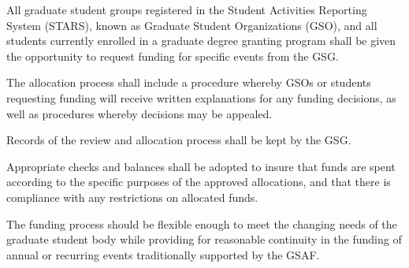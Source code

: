 \begin{bylaws-number}
\begin{bylaws-number}
    \item All graduate student groups registered in the Student Activities Reporting System (STARS), known as Graduate Student Organizations (GSO), and all students currently enrolled in a graduate degree granting program shall be given the opportunity to request funding for specific events from the GSG.
    \item The allocation process shall include a procedure whereby GSOs or students requesting funding will receive written explanations for any funding decisions, as well as procedures whereby decisions may be appealed.
    \item Records of the review and allocation process shall be kept by the GSG.
    \item Appropriate checks and balances shall be adopted to insure that funds are spent according to the specific purposes of the approved allocations, and that there is compliance with any restrictions on allocated funds.
    \item The funding process should be flexible enough to meet the changing needs of the graduate student body while providing for reasonable continuity in the funding of annual or recurring events traditionally supported by the GSAF.
  \end{bylaws-number}
\end{bylaws-number}

